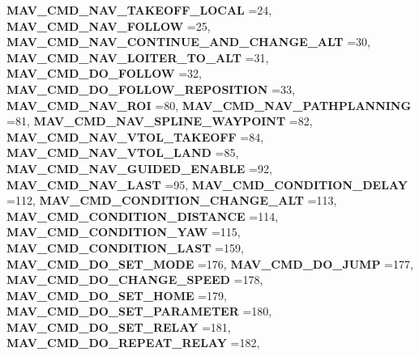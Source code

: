 \begin{DoxyCompactItemize}
\newline
\textbf{ M\+A\+V\+\_\+\+C\+M\+D\+\_\+\+N\+A\+V\+\_\+\+T\+A\+K\+E\+O\+F\+F\+\_\+\+L\+O\+C\+AL} =24, 
\textbf{ M\+A\+V\+\_\+\+C\+M\+D\+\_\+\+N\+A\+V\+\_\+\+F\+O\+L\+L\+OW} =25, 
\textbf{ M\+A\+V\+\_\+\+C\+M\+D\+\_\+\+N\+A\+V\+\_\+\+C\+O\+N\+T\+I\+N\+U\+E\+\_\+\+A\+N\+D\+\_\+\+C\+H\+A\+N\+G\+E\+\_\+\+A\+LT} =30, 
\textbf{ M\+A\+V\+\_\+\+C\+M\+D\+\_\+\+N\+A\+V\+\_\+\+L\+O\+I\+T\+E\+R\+\_\+\+T\+O\+\_\+\+A\+LT} =31, 
\newline
\textbf{ M\+A\+V\+\_\+\+C\+M\+D\+\_\+\+D\+O\+\_\+\+F\+O\+L\+L\+OW} =32, 
\textbf{ M\+A\+V\+\_\+\+C\+M\+D\+\_\+\+D\+O\+\_\+\+F\+O\+L\+L\+O\+W\+\_\+\+R\+E\+P\+O\+S\+I\+T\+I\+ON} =33, 
\textbf{ M\+A\+V\+\_\+\+C\+M\+D\+\_\+\+N\+A\+V\+\_\+\+R\+OI} =80, 
\textbf{ M\+A\+V\+\_\+\+C\+M\+D\+\_\+\+N\+A\+V\+\_\+\+P\+A\+T\+H\+P\+L\+A\+N\+N\+I\+NG} =81, 
\newline
\textbf{ M\+A\+V\+\_\+\+C\+M\+D\+\_\+\+N\+A\+V\+\_\+\+S\+P\+L\+I\+N\+E\+\_\+\+W\+A\+Y\+P\+O\+I\+NT} =82, 
\textbf{ M\+A\+V\+\_\+\+C\+M\+D\+\_\+\+N\+A\+V\+\_\+\+V\+T\+O\+L\+\_\+\+T\+A\+K\+E\+O\+FF} =84, 
\textbf{ M\+A\+V\+\_\+\+C\+M\+D\+\_\+\+N\+A\+V\+\_\+\+V\+T\+O\+L\+\_\+\+L\+A\+ND} =85, 
\textbf{ M\+A\+V\+\_\+\+C\+M\+D\+\_\+\+N\+A\+V\+\_\+\+G\+U\+I\+D\+E\+D\+\_\+\+E\+N\+A\+B\+LE} =92, 
\newline
\textbf{ M\+A\+V\+\_\+\+C\+M\+D\+\_\+\+N\+A\+V\+\_\+\+L\+A\+ST} =95, 
\textbf{ M\+A\+V\+\_\+\+C\+M\+D\+\_\+\+C\+O\+N\+D\+I\+T\+I\+O\+N\+\_\+\+D\+E\+L\+AY} =112, 
\textbf{ M\+A\+V\+\_\+\+C\+M\+D\+\_\+\+C\+O\+N\+D\+I\+T\+I\+O\+N\+\_\+\+C\+H\+A\+N\+G\+E\+\_\+\+A\+LT} =113, 
\textbf{ M\+A\+V\+\_\+\+C\+M\+D\+\_\+\+C\+O\+N\+D\+I\+T\+I\+O\+N\+\_\+\+D\+I\+S\+T\+A\+N\+CE} =114, 
\newline
\textbf{ M\+A\+V\+\_\+\+C\+M\+D\+\_\+\+C\+O\+N\+D\+I\+T\+I\+O\+N\+\_\+\+Y\+AW} =115, 
\textbf{ M\+A\+V\+\_\+\+C\+M\+D\+\_\+\+C\+O\+N\+D\+I\+T\+I\+O\+N\+\_\+\+L\+A\+ST} =159, 
\textbf{ M\+A\+V\+\_\+\+C\+M\+D\+\_\+\+D\+O\+\_\+\+S\+E\+T\+\_\+\+M\+O\+DE} =176, 
\textbf{ M\+A\+V\+\_\+\+C\+M\+D\+\_\+\+D\+O\+\_\+\+J\+U\+MP} =177, 
\newline
\textbf{ M\+A\+V\+\_\+\+C\+M\+D\+\_\+\+D\+O\+\_\+\+C\+H\+A\+N\+G\+E\+\_\+\+S\+P\+E\+ED} =178, 
\textbf{ M\+A\+V\+\_\+\+C\+M\+D\+\_\+\+D\+O\+\_\+\+S\+E\+T\+\_\+\+H\+O\+ME} =179, 
\textbf{ M\+A\+V\+\_\+\+C\+M\+D\+\_\+\+D\+O\+\_\+\+S\+E\+T\+\_\+\+P\+A\+R\+A\+M\+E\+T\+ER} =180, 
\textbf{ M\+A\+V\+\_\+\+C\+M\+D\+\_\+\+D\+O\+\_\+\+S\+E\+T\+\_\+\+R\+E\+L\+AY} =181, 
\newline
\textbf{ M\+A\+V\+\_\+\+C\+M\+D\+\_\+\+D\+O\+\_\+\+R\+E\+P\+E\+A\+T\+\_\+\+R\+E\+L\+AY} =182, 

\end{DoxyCompactItemize}
